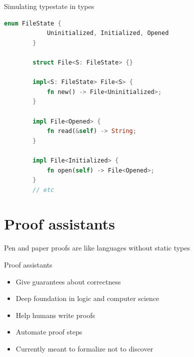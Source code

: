 \documentclass[compress,12pt,xcolor={dvipsnames}]{beamer}
\begin{document}
\begin{frame}[fragile]{Simulating typestate in types}
    \begin{lstlisting}[language=Rust,gobble=8]
        enum FileState {
            Uninitialized, Initialized, Opened
        }

        struct File<S: FileState> {}

        impl<S: FileState> File<S> {
            fn new() -> File<Uninitialized>;
        }

        impl File<Opened> {
            fn read(&self) -> String;
        }

        impl File<Initialized> {
            fn open(self) -> File<Opened>;
        }
        // etc
    \end{lstlisting}
\end{frame}

\section{Proof assistants}

\begin{frame}[standout]
    \centering\large
    Pen and paper proofs are like languages without static types
\end{frame}

\begin{frame}{Proof assistants}
    \begin{itemize}
        \item Give guarantees about correctness
        \item Deep foundation in logic and computer science
        \item Help humans write proofs
        \item Automate proof steps
        \item Currently meant to formalize not to discover
    \end{itemize}
\end{frame}
\end{document}
